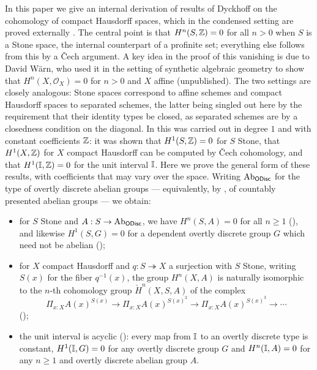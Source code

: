 In this paper we give an internal derivation of results of Dyckhoff
\cite{dyckhoff76,dyckhoff76-1} on the cohomology of compact Hausdorff spaces,
which in the condensed setting are proved externally \cite[Theorem
3.2]{Condensed}. The central point is that $H^n(S,\mathbb{Z}) = 0$ for all $n > 0$ when
$S$ is a Stone space, the internal counterpart of a profinite set;
everything else follows from this by a \v{C}ech argument. A key idea in the proof
of this vanishing is due to David W\"arn, who used it in the setting of synthetic
algebraic geometry to show that $H^n(X,\mathcal{O}_X) = 0$ for $n > 0$ and $X$
affine (unpublished). The two settings are closely analogous: Stone spaces
correspond to affine schemes and compact Hausdorff spaces to separated schemes,
the latter being singled out here by the requirement that their identity types be
closed, as separated schemes are by a closedness condition on the diagonal. In \cite[Section 5]{synthetic-stone-duality} this was carried
out in degree $1$ and with constant coefficients $\mathbb{Z}$: it was shown that
$H^1(S,\mathbb{Z}) = 0$ for $S$ Stone, that $H^1(X,\mathbb{Z})$ for $X$ compact Hausdorff can be
computed by \v{C}ech cohomology, and that $H^1(\mathbb{I},\mathbb{Z}) = 0$ for the unit interval
$\mathbb{I}$. Here we prove the general form of these results, with coefficients that may
vary over the space. Writing $\operatorname{Ab}_{\mathsf{ODisc}}$ for the type of overtly discrete
abelian groups --- equivalently, by ,
of countably presented abelian groups --- we obtain:

\begin{itemize}
\item for $S$ Stone and $A : S \to \operatorname{Ab}_{\mathsf{ODisc}}$, we have $H^n(S,A) = 0$ for
  all $n \geq 1$ (), and likewise $H^1(S,G) = 0$
  for a dependent overtly discrete group $G$ which need not be abelian
  ();
\item for $X$ compact Hausdorff and $q : S \twoheadrightarrow X$ a surjection with
  $S$ Stone, writing $S(x)$ for the fiber $q^{-1}(x)$, the group $H^n(X,A)$ is
  naturally isomorphic to the $n$-th cohomology group $\check{H}^n(X,S,A)$ of the complex
  \[\Pi_{x:X}A(x)^{S(x)} \to \Pi_{x:X}A(x)^{S(x)^2} \to
    \Pi_{x:X}A(x)^{S(x)^3} \to \cdots\]
  ();
\item the unit interval is acyclic (): every map from $\mathbb{I}$ to
  an overtly discrete type is constant, $H^1(\mathbb{I},G) = 0$ for any overtly discrete group $G$ and $H^n(\mathbb{I},A) = 0$ for
  any $n \geq 1$ and overtly discrete abelian group $A$.
\end{itemize}

